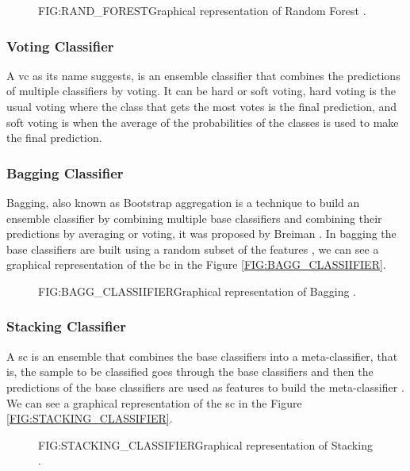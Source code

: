 \begin{figure}[Random Forest]{FIG:RAND_FOREST}{Graphical representation of Random Forest \cite{hemashreekilari_understanding_2023-2}.}
\end{figure}

\subsubsection{Voting Classifier}
A \ac{vc} as its name suggests, is an ensemble classifier that combines the predictions of multiple classifiers by voting. It can be hard or soft voting, hard voting is the usual voting where the class that gets the most votes is the final prediction, and soft voting is when the average of the probabilities of the classes is used to make the final prediction.

\subsubsection{Bagging Classifier}
Bagging, also known as Bootstrap aggregation is a technique to build an ensemble classifier by combining multiple base classifiers and combining their predictions by averaging or voting, it was proposed by Breiman \cite{breiman_bagging_1996}. In bagging the base classifiers are built using a random subset of the features \cite{scikit_learn_bagging_nodate}, we can see a graphical representation of the \ac{bc} in the Figure \ref{FIG:BAGG_CLASSIIFIER}.

\begin{figure}[Bagging Classifier]{FIG:BAGG_CLASSIIFIER}{Graphical representation of Bagging \cite{hemashreekilari_understanding_2023}.}
\end{figure}

\subsubsection{Stacking Classifier}
A \ac{sc} is an ensemble that combines the base classifiers into a meta-classifier, that is, the sample to be classified goes through the base classifiers and then the predictions of the base classifiers are used as features to build the meta-classifier \cite{wolpert_stacked_nodate}. We can see a graphical representation of the \ac{sc} in the Figure \ref{FIG:STACKING_CLASSIFIER}.

\begin{figure}[Stacking Classifier]{FIG:STACKING_CLASSIFIER}{Graphical representation of Stacking \cite{ceballos_stacking_2019}.}
\end{figure}
